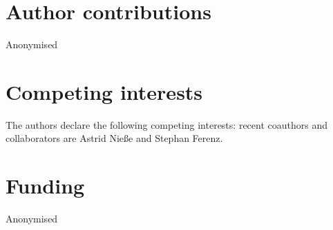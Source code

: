 \documentclass[11pt]{tibop-article}
\begin{document}
\section*{Author contributions}
Anonymised



\section*{Competing interests}
The authors declare the following competing interests: recent coauthors and collaborators are Astrid Nieße and Stephan Ferenz.

\section*{Funding}
Anonymised


\end{document}
